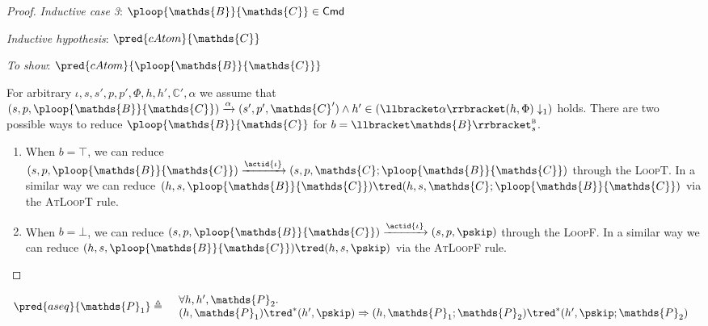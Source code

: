 {\begin{proof}
\textit{Inductive case 3}: $\ploop{\mathds{B}}{\mathds{C}} \in \mathsf{Cmd}$

\textit{Inductive hypothesis}: $\pred{cAtom}{\mathds{C}}$

\textit{To show}: $\pred{cAtom}{\ploop{\mathds{B}}{\mathds{C}}}$

For arbitrary $\iota, s, s', p, p', \Phi, h, h', \mathds{C}', \alpha$ we assume that $(s, p, \ploop{\mathds{B}}{\mathds{C}}) \xrightarrow{\alpha} (s', p', \mathds{C}') \land h' \in \left( \llbracket \alpha \rrbracket(h, \Phi) \downarrow_1 \right)$ holds. There are two possible ways to reduce $\ploop{\mathds{B}}{\mathds{C}}$ for $b = \llbracket \mathds{B} \rrbracket_{s}^{\textsc{b}}$.
\begin{enumerate}
\item When $b = \top$, we can reduce $(s, p, \ploop{\mathds{B}}{\mathds{C}}) \xrightarrow{\actid{\iota}} (s, p, \mathds{C} ; \ploop{\mathds{B}}{\mathds{C}})$ through the \textsc{LoopT}. In a similar way we can reduce $(h, s, \ploop{\mathds{B}}{\mathds{C}}) \tred (h, s, \mathds{C} ; \ploop{\mathds{B}}{\mathds{C}})$ via the \textsc{AtLoopT} rule.
\item When $b = \bot$, we can reduce $(s, p, \ploop{\mathds{B}}{\mathds{C}}) \xrightarrow{\actid{\iota}} (s, p, \pskip)$ through the \textsc{LoopF}. In a similar way we can reduce $(h, s, \ploop{\mathds{B}}{\mathds{C}}) \tred (h, s, \pskip)$ via the \textsc{AtLoopF} rule.
\end{enumerate}
\end{proof}
}

\lem \label{ref:aseq}
\[
\begin{array}{r l}
	\pred{aseq}{\mathds{P}_1} \triangleq
	&
	\begin{array}{l}
	\forall h, h', \mathds{P}_2 \ldotp \\
	(h, \mathds{P}_1) \tred^* (h', \pskip) \Rightarrow 
	(h, \mathds{P}_1; \mathds{P}_2) \tred^* (h', \pskip; \mathds{P}_2)
	\end{array}
\end{array}
\]

